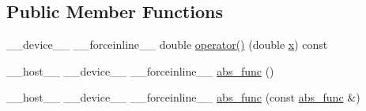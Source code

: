 \subsection*{Public Member Functions}
\begin{DoxyCompactItemize}
\item 
\-\_\-\-\_\-device\-\_\-\-\_\- \-\_\-\-\_\-forceinline\-\_\-\-\_\- double \hyperlink{structcv_1_1gpu_1_1device_1_1abs__func_3_01double_01_4_a8b93bfecfd26efd51c221eaa377b9846}{operator()} (double \hyperlink{highgui__c_8h_a6150e0515f7202e2fb518f7206ed97dc}{x}) const 
\item 
\-\_\-\-\_\-host\-\_\-\-\_\- \-\_\-\-\_\-device\-\_\-\-\_\- \-\_\-\-\_\-forceinline\-\_\-\-\_\- \hyperlink{structcv_1_1gpu_1_1device_1_1abs__func_3_01double_01_4_a9e7092b653020be2d0745e3824bc173c}{abs\-\_\-func} ()
\item 
\-\_\-\-\_\-host\-\_\-\-\_\- \-\_\-\-\_\-device\-\_\-\-\_\- \-\_\-\-\_\-forceinline\-\_\-\-\_\- \hyperlink{structcv_1_1gpu_1_1device_1_1abs__func_3_01double_01_4_a3dc16b1ec5517a401cadf9c8e86bcc3b}{abs\-\_\-func} (const \hyperlink{structcv_1_1gpu_1_1device_1_1abs__func}{abs\-\_\-func} \&)
\end{DoxyCompactItemize}


